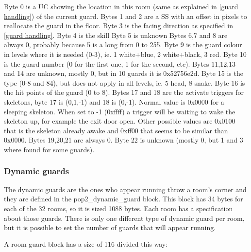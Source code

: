 \documentclass{article}
\begin{document}
 Byte 0 is a UC showing the location in this room (same as explained in
  \ref{guard handling}) of the current guard.
 Bytes 1 and 2 are a SS with an offset in pixels to reallocate the guard in
  the floor.
 Byte 3 is the facing direction as specified in \ref{guard handling}.
 Byte 4 is the skill
 Byte 5 is unknown
 Bytes 6,7 and 8 are always 0, probably because 5 is a long from 0 to 255.
 Byte 9 is the guard colour in levels where it is needed (0-3),
  ie. 1 white+blue, 2 white+black, 3 red.
 Byte 10 is the guard number (0 for the first one, 1 for the second, etc).
 Bytes 11,12,13 and 14 are unknown, mostly 0, but in 10 guards it is
  0x52756e2d.
 Byte 15 is the type (0-8 and 84), but does not apply in all levels,
  ie. 5 head, 8 snake.
 Byte 16 is the hit points of the guard (0 to 8).
 Bytes 17 and 18 are the activate triggers for skeletons, byte 17 is
  (0,1,-1) and 18 is (0,-1). Normal value is 0x0000 for a sleeping
  skeleton. When set to -1 (0xffff) a trigger will be waiting to wake the
  skeleton up, for example the exit door open. Other possible values are
  0x0100 that is the skeleton already awake and 0xff00 that seems to be
  similar than 0x0000.
 Bytes 19,20,21 are always 0.
 Byte 22 is unknown (mostly 0, but 1 and 3 where found for some guards).

\subsubsection{Dynamic guards} %
 
 The dynamic guards are the ones who appear running throw a room's corner
 and they are defined in the pop2\_dynamic\_guard block.
 This block has 34 bytes for each of the 32 rooms, so it is sized 1088
 bytes. Each room has a specification about those guards.
 There is only one different type of dynamic guard per room, but it is
 possible to set the number of guards that will appear running.
 
 A room guard block has a size of 116 divided this way:
\end{document}
